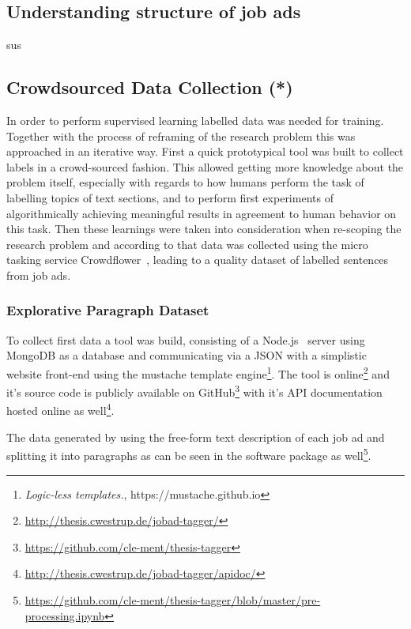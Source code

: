 \subsection{Understanding structure of job ads}
\label{sub:Understanding structure of job ads}

sus


\subsection{Crowdsourced Data Collection (*)}


In order to perform supervised learning labelled data was needed for training. Together with the process of reframing of the research problem this was approached in an iterative way. First a quick prototypical tool was built to collect labels in a crowd-sourced fashion. This allowed getting more knowledge about the problem itself, especially with regards to how humans perform the task of labelling topics of text sections, and to perform first experiments of algorithmically achieving meaningful results in agreement to human behavior on this task. Then these learnings were taken into consideration when re-scoping the research problem and according to that data was collected using the micro tasking service Crowdflower~\cite{crowdflower}, leading to a quality dataset of labelled sentences from job ads.

\subsubsection{Explorative Paragraph Dataset}


To collect first data a tool was build, consisting of a Node.js~\cite{nodejs} server using MongoDB\cite{mongodb} as a database and communicating via a JSON with a simplistic website front-end using the mustache template engine\footnote{\emph{Logic-less templates.}, https://mustache.github.io}. The tool is online\footnote{\url{http://thesis.cwestrup.de/jobad-tagger/}} and it's source code is publicly available on GitHub\footnote{\url{https://github.com/cle-ment/thesis-tagger}} with it's API documentation hosted online as well\footnote{\url{http://thesis.cwestrup.de/jobad-tagger/apidoc/}}.

The data generated by using the free-form text description of each job ad and splitting it into paragraphs as can be seen in the software package as well\footnote{\url{https://github.com/cle-ment/thesis-tagger/blob/master/pre-processing.ipynb}}.

